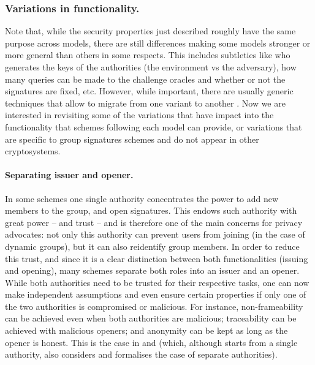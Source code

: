 \subsubsection{Variations in functionality.}
%
Note that, while the security properties just described roughly have the same
purpose across models, there are still differences making some models stronger
or more general than others in some respects. This includes subtleties like who
generates the keys of the authorities (the environment vs the adversary), how
many queries can be made to the challenge oracles and whether or not the
signatures are fixed, etc. However, while important, there are usually generic
techniques that allow to migrate from one variant to another . Now we are interested in revisiting some of
the variations that have impact into the functionality that schemes
following each model can provide, or variations that are specific to group
signatures schemes and do not appear in other cryptosystems.

\paragraph{Separating issuer and opener.}
In some schemes \cite{bmw03,kty04} one single authority concentrates the
power to add new members to the group, and open signatures. This endows such authority with great
power -- and trust -- and is therefore one of the main concerns for privacy
advocates: not only this authority can prevent users from joining (in the case
of dynamic groups), but it can also reidentify group members. In order to reduce
this trust, and since it is a clear distinction between both functionalities
(issuing and opening), many schemes separate both roles into an issuer and an
opener. While both authorities need to be trusted for their respective tasks,
one can now make independent assumptions and even ensure certain properties
if only one of the two authorities is compromised or malicious. For instance,
non-frameability can be achieved even when both authorities are malicious;
traceability can be achieved with malicious openers; and anonymity can be
kept as long as the opener is honest. This is the case in \cite{bsz05} and
\cite{ky06} (which, although starts from a single authority, also considers
and formalises the case of separate authorities).

